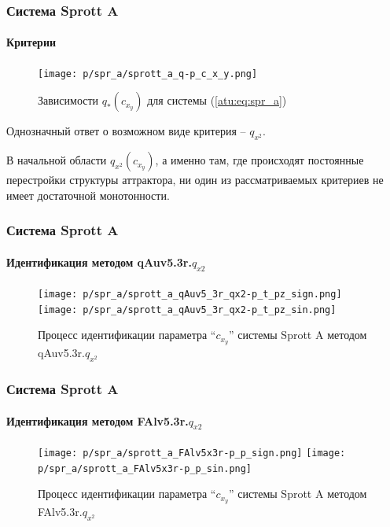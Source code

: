 \documentclass[10pt,utf8]{beamer}
\begin{document}

\begin{frame}
  \frametitle{Система Sprott A}
  \framesubtitle{Критерии}


  \begin{figure}[htb!]
  \centerline{
    \texttt{[image: p/spr\_a/sprott\_a\_q-p\_c\_x\_y.png]}
  }
  \caption{Зависимости $q_{*}(c_{x_y})$ для системы (\ref{atu:eq:spr_a}) }
  \label{atu:f:spr_a_q}
  \end{figure}

  \vspace{-4ex}
  Однозначный ответ о возможном виде критерия -- $q_{x^2}$.

  В начальной области
  $q_{x^2}(c_{x_y}) $, а именно там, где происходят постоянные
  перестройки структуры аттрактора, ни один из рассматриваемых критериев
  не имеет достаточной монотонности.
\end{frame}




\begin{frame}
  \frametitle{Система Sprott A}
  \framesubtitle{Идентификация методом qAuv5.3r.$q_{x2}$}


\begin{figure}[h!]
  \centerline{
    \texttt{[image: p/spr\_a/sprott\_a\_qAuv5\_3r\_qx2-p\_t\_pz\_sign.png]}
    \hfill
    \texttt{[image: p/spr\_a/sprott\_a\_qAuv5\_3r\_qx2-p\_t\_pz\_sin.png]}
  }
  \caption{Процесс идентификации параметра ``$c_{x_y}$'' системы Sprott A методом qAuv5.3r.$q_{x^2}$}
  \label{atu:f:spr_a_id_qAuv5.3r.q_x2_sign}
\end{figure}

\end{frame}



\begin{frame}
  \frametitle{Система Sprott A}
  \framesubtitle{Идентификация методом FAlv5.3r.$q_{x2}$}


\begin{figure}[h!]
  \centerline{
    \texttt{[image: p/spr\_a/sprott\_a\_FAlv5x3r-p\_p\_sign.png]}
    \hfill
    \texttt{[image: p/spr\_a/sprott\_a\_FAlv5x3r-p\_p\_sin.png]}
  }
  \caption{Процесс идентификации параметра ``$c_{x_y}$'' системы Sprott A методом FAlv5.3r.$q_{x^2}$}
  \label{atu:f:spr_a_id_FAlv5.3r.q_x2_sign}
\end{figure}

\end{frame}
\end{document}
